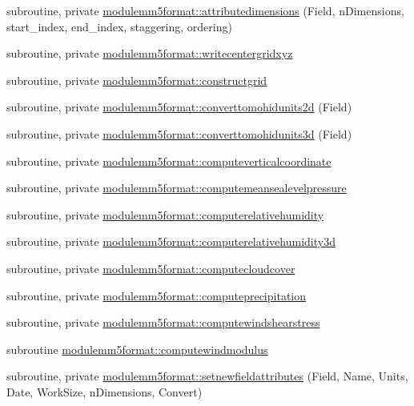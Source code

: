 \begin{DoxyCompactItemize}
\item 
subroutine, private \mbox{\hyperlink{namespacemodulemm5format_a0c0413b1da7f8da860aef9b811b0c725}{modulemm5format\+::attributedimensions}} (Field, n\+Dimensions, start\+\_\+index, end\+\_\+index, staggering, ordering)
\item 
subroutine, private \mbox{\hyperlink{namespacemodulemm5format_a0042a10dda1e04b0a6aeb4d67aec1d11}{modulemm5format\+::writecentergridxyz}}
\item 
subroutine, private \mbox{\hyperlink{namespacemodulemm5format_aaf7b2df73bb7e6d30db2af2b3493559a}{modulemm5format\+::constructgrid}}
\item 
subroutine, private \mbox{\hyperlink{namespacemodulemm5format_a971d0306a569327363e6c98d9e1dd0c7}{modulemm5format\+::converttomohidunits2d}} (Field)
\item 
subroutine, private \mbox{\hyperlink{namespacemodulemm5format_a0afd52db4648ea76112e242c40b31323}{modulemm5format\+::converttomohidunits3d}} (Field)
\item 
subroutine, private \mbox{\hyperlink{namespacemodulemm5format_a904f7716ce2118cfd1236ab57b46a0f3}{modulemm5format\+::computeverticalcoordinate}}
\item 
subroutine, private \mbox{\hyperlink{namespacemodulemm5format_a2b31840d538f04c681c86a26a2feb21f}{modulemm5format\+::computemeansealevelpressure}}
\item 
subroutine, private \mbox{\hyperlink{namespacemodulemm5format_a3dffbb656aa84f1197105f493790f428}{modulemm5format\+::computerelativehumidity}}
\item 
subroutine, private \mbox{\hyperlink{namespacemodulemm5format_a6beb646cd455e39599d5f9f360390986}{modulemm5format\+::computerelativehumidity3d}}
\item 
subroutine, private \mbox{\hyperlink{namespacemodulemm5format_af9b804a0c8c480ae7a682237c8d37831}{modulemm5format\+::computecloudcover}}
\item 
subroutine, private \mbox{\hyperlink{namespacemodulemm5format_a86c95504025ac2f03c9c7aa475a35cc4}{modulemm5format\+::computeprecipitation}}
\item 
subroutine, private \mbox{\hyperlink{namespacemodulemm5format_af869ebd4b03375bc5013329b9bce52d7}{modulemm5format\+::computewindshearstress}}
\item 
subroutine \mbox{\hyperlink{namespacemodulemm5format_a9b2d602cf6fbd9095b5738722bd3a13c}{modulemm5format\+::computewindmodulus}}
\item 
subroutine, private \mbox{\hyperlink{namespacemodulemm5format_afeeb0d8621c7c92d9be8dd4db8e1bf3d}{modulemm5format\+::setnewfieldattributes}} (Field, Name, Units, Date, Work\+Size, n\+Dimensions, Convert)

\end{DoxyCompactItemize}
